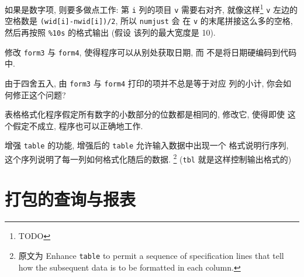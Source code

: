 如果是数字项, 则要多做点工作: 第 \verb'i' 列的项目 \verb'v' 需要右对齐,
就像这样\footnote{TODO}
\verb'v' 左边的空格数是 \verb'(wid[i]-nwid[i])/2', 所以 \verb'numjust' 会
在 \verb'v' 的末尾拼接这么多的空格, 然后再按照 \verb'%10s' 的格式输出 (假设 
该列的最大宽度是 10).

\begin{exercise}
	修改 \verb'form3' 与 \verb'form4', 使得程序可以从别处获取日期, 而
	不是将日期硬编码到代码中.
\end{exercise}

\begin{exercise}
    由于四舍五入, 由 \verb'form3' 与 \verb'form4' 打印的项并不总是等于对应
    列的小计, 你会如何修正这个问题?
\end{exercise}

\begin{exercise}
    表格格式化程序假定所有数字的小数部分的位数都是相同的, 修改它, 使得即使 
    这个假定不成立, 程序也可以正确地工作.
\end{exercise}

\begin{exercise}
    增强 \verb'table' 的功能, 增强后的 \verb'table' 允许输入数据中出现一个
    格式说明行序列, 这个序列说明了每一列如何格式化随后的数据.
    \footnote{原文为 
        Enhance \texttt{table} to permit a sequence of specification lines
        that tell how the subsequent data is to be formatted in each column.
    } (\texttt{tbl} 就是这样控制输出格式的)
\end{exercise}

\section{打包的查询与报表}
\label{sec:packaged_queries_and_reports}


